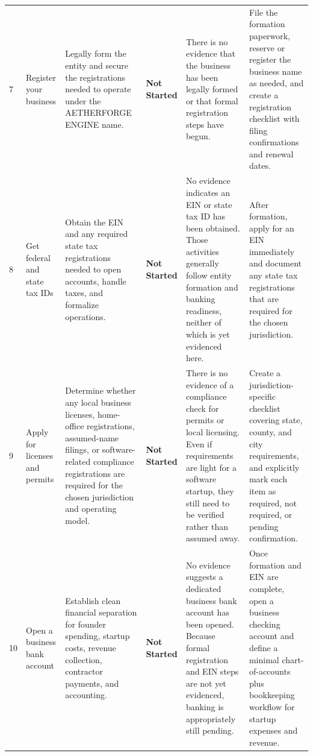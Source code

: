 \documentclass[10pt]{article}
\newcommand{\Status}[1]{\textbf{#1}}
\begin{document}
\begin{landscape}
\begin{longtable}{L{0.45in}L{1.35in}L{1.95in}L{0.80in}L{1.85in}L{1.85in}}
7 & Register your business & Legally form the entity and secure the registrations needed to operate under the AETHERFORGE ENGINE name. & \Status{Not Started} & There is no evidence that the business has been legally formed or that formal registration steps have begun. & File the formation paperwork, reserve or register the business name as needed, and create a registration checklist with filing confirmations and renewal dates. \\

8 & Get federal and state tax IDs & Obtain the EIN and any required state tax registrations needed to open accounts, handle taxes, and formalize operations. & \Status{Not Started} & No evidence indicates an EIN or state tax ID has been obtained. Those activities generally follow entity formation and banking readiness, neither of which is yet evidenced here. & After formation, apply for an EIN immediately and document any state tax registrations that are required for the chosen jurisdiction. \\

9 & Apply for licenses and permits & Determine whether any local business licenses, home-office registrations, assumed-name filings, or software-related compliance registrations are required for the chosen jurisdiction and operating model. & \Status{Not Started} & There is no evidence of a compliance check for permits or local licensing. Even if requirements are light for a software startup, they still need to be verified rather than assumed away. & Create a jurisdiction-specific checklist covering state, county, and city requirements, and explicitly mark each item as required, not required, or pending confirmation. \\

10 & Open a business bank account & Establish clean financial separation for founder spending, startup costs, revenue collection, contractor payments, and accounting. & \Status{Not Started} & No evidence suggests a dedicated business bank account has been opened. Because formal registration and EIN steps are not yet evidenced, banking is appropriately still pending. & Once formation and EIN are complete, open a business checking account and define a minimal chart-of-accounts plus bookkeeping workflow for startup expenses and revenue. \\

\end{longtable}
\end{landscape}
\end{document}
